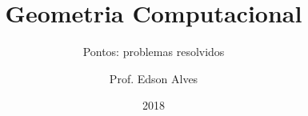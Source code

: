\title{Geometria Computacional}
\subtitle{Pontos: problemas resolvidos}
\date{2018}
\author{Prof. Edson Alves}
